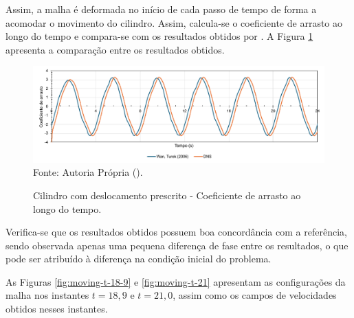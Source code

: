 Assim, a malha é deformada no início de cada passo de tempo de forma a acomodar o movimento do cilindro. Assim, calcula-se o coeficiente de arrasto ao longo do tempo e compara-se com os resultados obtidos por . A Figura \ref{fig:moving-cylinder-results} apresenta a comparação entre os resultados obtidos.

\begin{figure}[h!]
    \centering
    \caption{Cilindro com deslocamento prescrito - Coeficiente de arrasto ao longo do tempo.}
    \includegraphics[width=\linewidth]{Figuras/moving-cylinder/Cd.pdf}
    \\Fonte: Autoria Própria (\the\year).
    \label{fig:moving-cylinder-results}
\end{figure}

Verifica-se que os resultados obtidos possuem boa concordância com a referência, sendo observada apenas uma pequena diferença de fase entre os resultados, o que pode ser atribuído à diferença na condição inicial do problema.

As Figuras \ref{fig:moving-t-18-9} e \ref{fig:moving-t-21} apresentam as configurações da malha nos instantes $t=18,9$ e $t=21,0$, assim como os campos de velocidades obtidos nesses instantes.

